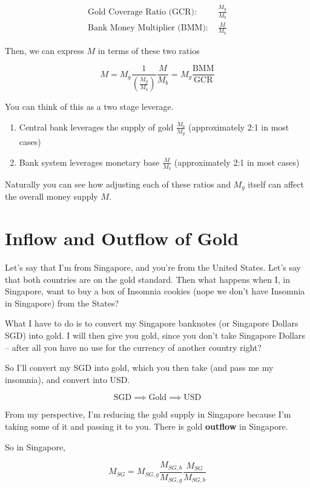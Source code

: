 \documentclass[11pt]{scrartcl}
\begin{document}
\begin{align*}
\text{Gold Coverage Ratio (GCR):  } &\frac{M_g}{M_b} \\
\text{Bank Money Multiplier (BMM):  } &\frac{M}{M_b}
\end{align*}

Then, we can express $M$ in terms of these two ratios

\[ M = M_g  \frac{1}{\left(\frac{M_g}{M_b}\right)}  \frac{M}{M_b} = M_g \frac{\mathrm{BMM}}{\mathrm{GCR}} \] 

You can think of this as a two stage leverage.

\begin{enumerate}
\item Central bank leverages the supply of gold $\frac{M_b}{M_g}$ (approximately 2:1 in most cases)
\item Bank system leverages monetary base $\frac{M}{M_b}$ (approximately 2:1 in most cases)
\end{enumerate}

Naturally you can see how adjusting each of these ratios and $M_g$ itself can affect the overall money supply $M$.

\section{Inflow and Outflow of Gold}

Let's say that I'm from Singapore, and you're from the United States. Let's say that both countries are on the gold standard. Then what happens when I, in Singapore, want to buy a box of Insomnia cookies (nope we don't have Insomnia in Singapore) from the States?

What I have to do is to convert my Singapore banknotes (or Singapore Dollars SGD) into gold. I will then give you gold, since you don't take Singapore Dollars -- after all you have no use for the currency of another country right?

So I'll convert my SGD into gold, which you then take (and pass me my insomnia), and convert into USD. 

\[ \mathrm{SGD} \implies \mathrm{Gold} \implies \mathrm{USD} \]

From my perspective, I'm reducing the gold supply in Singapore because I'm taking some of it and passing it to you. There is gold \textbf{outflow} in Singapore.

So in Singapore,

\[ M_{SG} = M_{SG,g} \frac{M_{SG,b}}{M_{SG,g}} \frac{M_{SG}}{M_{SG,b}} \] 
\end{document}
